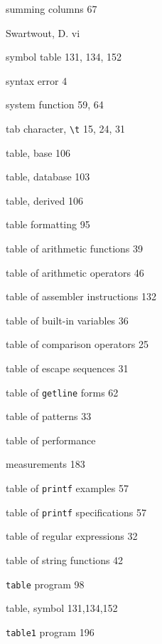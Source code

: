 \begin{multicols}{3}
\hangindent=3pc  summing columns 67

\hangindent=3pc  Swartwout, D. vi

\hangindent=3pc  symbol table 131, 134, 152

\hangindent=3pc  syntax error 4

\hangindent=3pc  system function 59, 64

\hangindent=3pc  tab character, \verb'\t' 15, 24, 31

\hangindent=3pc  table, base 106

\hangindent=3pc  table, database 103

\hangindent=3pc  table, derived 106

\hangindent=3pc  table formatting 95

\hangindent=3pc  table of arithmetic functions 39

\hangindent=3pc  table of arithmetic operators 46

\hangindent=3pc  table of assembler instructions 132

\hangindent=3pc  table of built-in variables 36

\hangindent=3pc  table of comparison operators 25

\hangindent=3pc  table of escape sequences 31

\hangindent=3pc  table of \verb'getline' forms 62

\hangindent=3pc  table of patterns 33

\hangindent=3pc  table of performance

\hangindent=3pc  measurements 183

\hangindent=3pc  table of \verb'printf' examples 57

\hangindent=3pc  table of \verb'printf' specifications 57

\hangindent=3pc  table of regular expressions 32

\hangindent=3pc  table of string functions 42

\hangindent=3pc  \verb'table' program 98

\hangindent=3pc  table, symbol 131,134,152

\hangindent=3pc  \verb'table1' program 196


\end{multicols}
